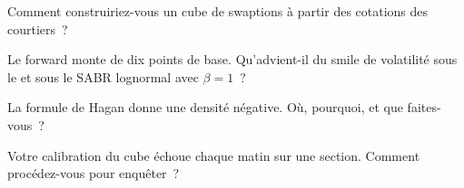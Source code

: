 \begin{interviewq}\label{iq:rc:sabr-in-rates-and-the-volatility-cube:3}
Comment construiriez-vous un cube de swaptions à partir des cotations des courtiers~?
\end{interviewq}

\begin{interviewq}\label{iq:rc:sabr-in-rates-and-the-volatility-cube:4}
Le forward monte de dix points de base. Qu'advient-il du smile de volatilité sous le
 et sous le SABR lognormal avec $\beta=1$~?
\end{interviewq}

\begin{interviewq}\label{iq:rc:sabr-in-rates-and-the-volatility-cube:5}
La formule de Hagan donne une densité négative. Où, pourquoi, et que faites-vous~?
\end{interviewq}

\begin{interviewq}\label{iq:rc:sabr-in-rates-and-the-volatility-cube:6}
Votre calibration du cube échoue chaque matin sur une section. Comment procédez-vous
pour enquêter~?
\end{interviewq}

